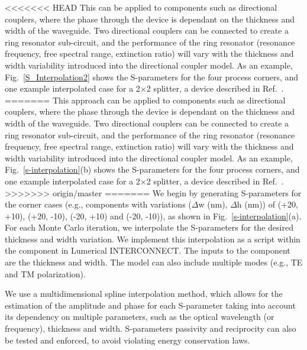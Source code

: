 \documentclass[journal]{spie}
\begin{document}
<<<<<<< HEAD
This can be applied to components such as directional couplers, where the phase through the device is dependant on the thickness and width of the waveguide.  Two directional couplers can be connected to create a ring resonator sub-circuit, and the performance of the ring resonator (resonance frequency, free spectral range, extinction ratio) will vary with the thickness and width variability introduced into the directional coupler model.  As an example, Fig.~\ref{S_Interpolation2} shows the S-parameters for the four process corners, and one example interpolated case for a 2$\times$2 splitter, a device described in Ref.~. 
=======
This approach can be applied to components such as directional couplers, where the phase through the device is dependant on the thickness and width of the waveguide.  Two directional couplers can be connected to create a ring resonator sub-circuit, and the performance of the ring resonator (resonance frequency, free spectral range, extinction ratio) will vary with the thickness and width variability introduced into the directional coupler model.  As an example, Fig.~\ref{s-interpolation}(b) shows the S-parameters for the four process corners, and one example interpolated case for a 2$\times$2 splitter, a device described in Ref.~. 
>>>>>>> origin/master
=======
We begin by generating S-parameters for the corner cases (e.g., components with variations ($\Delta$w (nm), $\Delta$h (nm)) of (+20, +10), (+20, -10), (-20, +10) and (-20, -10)), as shown in Fig.~\ref{s-interpolation}(a).  For each Monte Carlo iteration, we interpolate the S-parameters for the desired thickness and width variation.  We implement this interpolation as a script within the component in Lumerical INTERCONNECT.  The inputs to the component are the thickness and width.
The model can also include multiple modes (e.g., TE and TM polarization).

We use a multidimensional spline interpolation method, which allows for the estimation of the amplitude and phase for each S-parameter taking into account its dependency on multiple parameters, such as the optical wavelength (or frequency), thickness and width.  S-parameters passivity and reciprocity can also be tested and enforced, to avoid violating energy conservation laws.  
\end{document}

